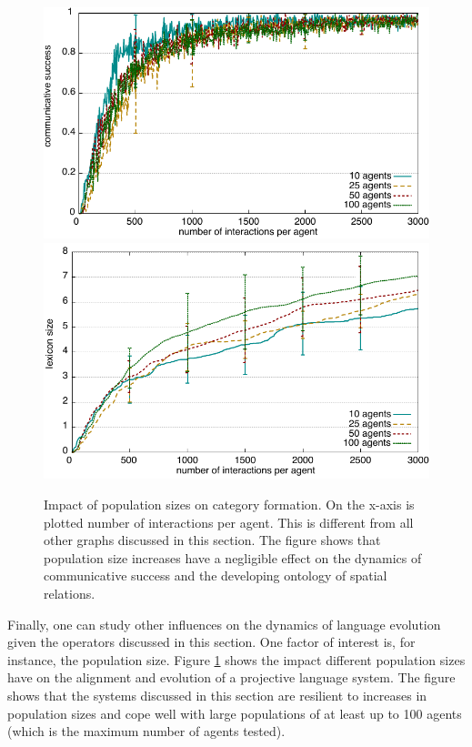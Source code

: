 \begin{figure}
\begin{center}
\includegraphics[width=0.9\columnwidth]{figs/category-formation-experiment-success-vs-population-size}
\includegraphics[width=0.9\columnwidth]{figs/category-formation-experiment-lexicon-size-vs-population-size}
\end{center}
\caption[Impact of population sizes on category formation]{%
Impact of population sizes on category formation. On the x-axis is plotted number
of interactions per agent. This is different from all other graphs discussed in this section.
The figure shows that population size increases have a negligible effect on the dynamics
of communicative success and the developing ontology of spatial relations.}
\label{f:impact-population-size}
\end{figure}

Finally, one can study other influences on the dynamics of language evolution
given the operators discussed in this section. One factor of interest is, for instance,
the population size. Figure \ref{f:impact-population-size} shows the impact different
population sizes have on the alignment and evolution of a projective language
system. The figure shows that the systems discussed in this section are
resilient to increases in population sizes and cope well with large populations of at
least up to 100 agents (which is the maximum number of agents tested).




